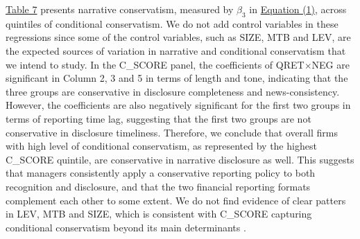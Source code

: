 \documentclass[letterpaper,12pt]{article}
\begin{document}
\begin{spacing}{1.5}
\hyperref[T7]{Table 7} presents narrative conservatism, measured by $\beta_3$ in \hyperref[eq1]{Equation (1)}, across quintiles of conditional conservatism. We do not add control variables in these regressions since some of the control variables, such as SIZE, MTB and LEV, are the expected sources of variation in narrative and conditional conservatism that we intend to study. In the C\_SCORE panel, the coefficients of QRET$\times$NEG are significant in Column 2, 3 and 5 in terms of length and tone, indicating that the three groups are conservative in disclosure completeness and news-consistency. However, the coefficients are also negatively significant for the first two groups in terms of reporting time lag, suggesting that the first two groups are not conservative in disclosure timeliness. Therefore, we conclude that overall firms with high level of conditional conservatism, as represented by the highest C\_SCORE quintile, are conservative in narrative disclosure as well. This suggests that managers consistently apply a conservative reporting policy to both recognition and disclosure, and that the two financial reporting formats complement each other to some extent. We do not find evidence of clear patters in LEV, MTB and SIZE, which is consistent with C\_SCORE capturing conditional conservatism beyond its main determinants \cite{khanEstimationEmpiricalProperties2009}.


\end{spacing}
\end{document}
